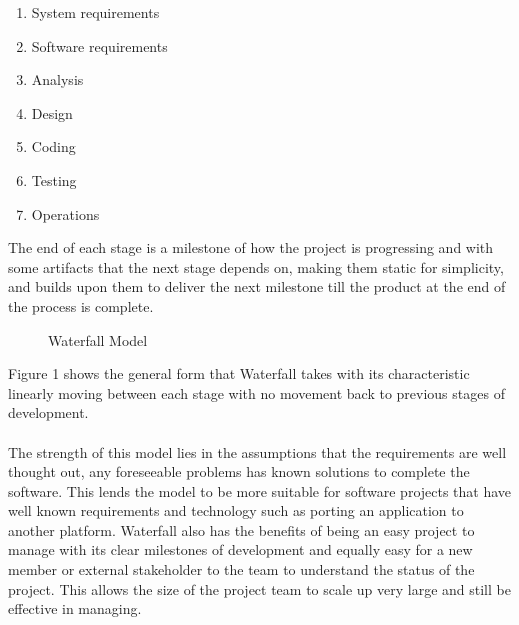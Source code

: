 \documentclass{style/CRPITStyle}
\begin{document}
\begin{enumerate}
  \item System requirements
  \item Software requirements
  \item Analysis
  \item Design
  \item Coding
  \item Testing 
  \item Operations
\end{enumerate}

The end of each stage is a milestone of how the project is progressing and with some artifacts
that the next stage depends on, making them static for simplicity, and builds upon
them to deliver the next milestone till the product at the end of the process is
complete.

\vspace{.1in}

\begin{figure}[htb]
\caption{\protect\label{waterfall}  Waterfall Model}
\end{figure}

\vspace{.1in}

Figure 1 shows the general form that Waterfall takes with its characteristic 
linearly moving between each stage with no movement back to previous stages of
development.

\paragraph{}

The strength of this model lies in the assumptions that the requirements are
well thought out, any foreseeable problems has known solutions to complete the
software.
This lends the model to be more suitable for software projects that have well known
requirements and technology such as porting an application to another platform.
Waterfall also has the benefits of being an easy project to manage with its
clear milestones of development and equally easy for a new member or external
stakeholder to the team to understand the status of the project.
This allows the size of the project team to scale up very large and still be
effective in managing.
\end{document}
